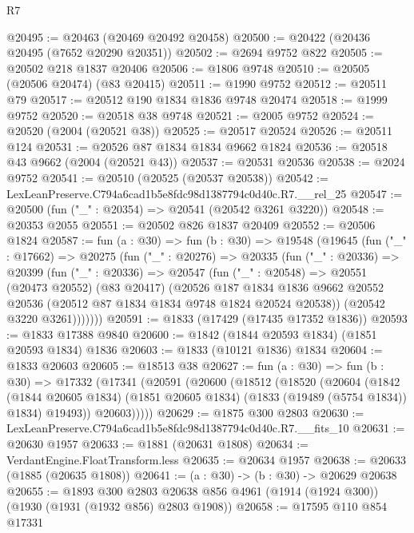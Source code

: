 \begin{lexlean}{R7}
\begin{coremodule}
@20495 := @20463 (@20469 @20492 @20458)
@20500 := @20422 (@20436 @20495 (@7652 @20290 @20351))
@20502 := @2694 @9752 @822
@20505 := @20502 @218 @1837 @20406
@20506 := @1806 @9748
@20510 := @20505 (@20506 @20474) (@83 @20415)
@20511 := @1990 @9752
@20512 := @20511 @79
@20517 := @20512 @190 @1834 @1836 @9748 @20474
@20518 := @1999 @9752
@20520 := @20518 @38 @9748
@20521 := @2005 @9752
@20524 := @20520 (@2004 (@20521 @38))
@20525 := @20517 @20524
@20526 := @20511 @124
@20531 := @20526 @87 @1834 @1834 @9662 @1824
@20536 := @20518 @43 @9662 (@2004 (@20521 @43))
@20537 := @20531 @20536
@20538 := @2024 @9752
@20541 := @20510 (@20525 (@20537 @20538))
@20542 := LexLeanPreserve.C794a6cad1b5e8fdc98d1387794c0d40c.R7.__rel_25
@20547 := @20500 (fun ("_" : @20354) => @20541 (@20542 @3261 @3220))
@20548 := @20353 @2055
@20551 := @20502 @826 @1837 @20409
@20552 := @20506 @1824
@20587 := fun (a : @30) =>
  fun (b : @30) =>
  @19548
    (@19645
      (fun ("_" : @17662) =>
      @20275
        (fun ("_" : @20276) =>
        @20335
          (fun ("_" : @20336) =>
          @20399
            (fun ("_" : @20336) =>
            @20547
              (fun ("_" : @20548) =>
              @20551
                (@20473 @20552)
                (@83 @20417)
                (@20526
                  @187
                  @1834
                  @1836
                  @9662
                  @20552
                  @20536
                  (@20512 @87 @1834 @1834 @9748 @1824 @20524 @20538))
                (@20542 @3220 @3261)))))))
@20591 := @1833 (@17429 (@17435 @17352 @1836))
@20593 := @1833 @17388 @9840
@20600 := @1842 (@1844 @20593 @1834) (@1851 @20593 @1834) @1836
@20603 := @1833 (@10121 @1836) @1834
@20604 := @1833 @20603
@20605 := @18513 @38
@20627 := fun (a : @30) =>
  fun (b : @30) =>
  @17332
    (@17341
      (@20591
        (@20600
          (@18512
            (@18520
              (@20604
                (@1842
                  (@1844 @20605 @1834)
                  (@1851 @20605 @1834)
                  (@1833 (@19489 (@5754 @1834)) @1834)
                  @19493))
              @20603)))))
@20629 := @1875 @300 @2803
@20630 := LexLeanPreserve.C794a6cad1b5e8fdc98d1387794c0d40c.R7.__fits_10
@20631 := @20630 @1957
@20633 := @1881 (@20631 @1808)
@20634 := VerdantEngine.FloatTransform.less
@20635 := @20634 @1957
@20638 := @20633 (@1885 (@20635 @1808))
@20641 := (a : @30) -> (b : @30) -> @20629 @20638
@20655 := @1893
    @300
    @2803
    @20638
    @856
    @4961
    (@1914 (@1924 @300))
    (@1930 (@1931 (@1932 @856) @2803 @1908))
@20658 := @17595 @110 @854 @17331

\end{coremodule}
\end{lexlean}
